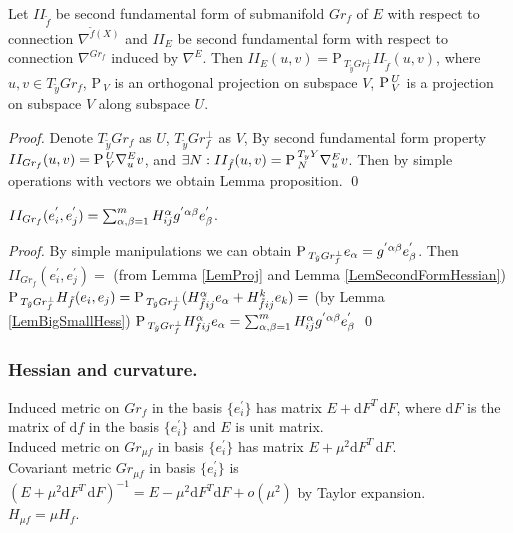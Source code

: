 \documentclass{llncs}
\newcommand{\Proj}{\mathrm{P}{\,}}
\newcommand{\ProjNonOrth}[2]{\tensor*{\Proj}{^{#1}_{#2}}}
\newcommand{\CovariantDiffManif}[1]{\nabla^{#1}}
\newcommand{\CovariantDerivManif}[2]{\tensor*{\nabla}{^{#1}_{#2}}}
\newcommand{\Diff}{\mathrm{d}}
\begin{document}
\begin{lemma} \label{LemProj}
Let $II_{\tilde{f}}$ be second fundamental form of submanifold $Gr_f$ of $E$ with respect to connection $\CovariantDiffManif{\tilde{f}(X)}$ and $II_E$ be second fundamental form with respect to connection $\CovariantDiffManif{Gr_f}$ induced by $\CovariantDiffManif{E}$. Then $II_E(u, v) = \Proj_{T_{\tilde{y}}Gr_f^{\bot}} II_{\tilde{f}}(u, v)$, where $u, v \in T_{\tilde{y}}Gr_f$, $\Proj_V$ is an orthogonal projection on subspace $V$, $\ProjNonOrth{U}{V}$ is a projection on subspace $V$ along subspace $U$.
\end{lemma}

\begin{proof}
Denote $T_{\tilde{y}}Gr_f$ as $U$, $T_{\tilde{y}}Gr_f^{\bot}$ as $V$, 
By second fundamental form property $II_{Gr_f}(u, v) = \ProjNonOrth{U}{V}\CovariantDerivManif{E}{u}v$, and $\exists N: 
II_{\tilde{f}}(u, v) = \ProjNonOrth{T_yY}{N}\CovariantDerivManif{E}{u}v$. Then by simple operations with vectors we obtain Lemma proposition.
\qed
\end{proof}

\begin{lemma} \label{LemSecondHessianFormula}
$II_{Gr_f}(e_i^{'}, e_j^{'})=\sum_{\alpha, \beta=1}^{m} \tensor*{H}{^{\alpha}_i_j} \tensor*{g}{^{'}^{\alpha}^{\beta}} e_{\beta}^{'}$.
\end{lemma}

\begin{proof}
By simple manipulations we can obtain $\Proj_{T_{\tilde{y}}Gr_f^{\bot}}e_{\alpha} = \tensor*{g}{^{'}^{\alpha}^{\beta}} e_{\beta}^{'}$. 
Then $II_{Gr_f}(e_i^{'}, e_j^{'}) =$ (from Lemma \ref{LemProj} and Lemma \ref{LemSecondFormHessian}) 
$\Proj_{T_{\tilde{y}}Gr_f^{\bot}} H_{\tilde{f}}(e_i, e_j) = 
\Proj_{T_{\tilde{y}}Gr_f^{\bot}} (\tensor*{H}{_{\tilde{f}}^{\alpha}_i_j} e_{\alpha} + \tensor*{H}{^{k}_{\tilde{f}}_i_j} e_{k}) 
=$ (by Lemma \ref{LemBigSmallHess}) $\Proj_{T_{\tilde{y}}Gr_f^{\bot}} \tensor*{H}{^{\alpha}_f_i_j}e_{\alpha} 
= \sum_{\alpha, \beta=1}^{m} \tensor*{H}{^{\alpha}_i_j} \tensor*{g}{^{'}^{\alpha}^{\beta}} e_{\beta}^{'}$
\qed
\end{proof}

\subsubsection{Hessian and curvature.}

\begin{proposition} \label{PropScaled}
Induced metric on $Gr_f$ in the basis $\{ e_i^{'} \}$ has matrix $E + \Diff F^{T} \, \Diff F$, 
where $\Diff F$ is the matrix of $\Diff f$ in the basis $\{ e_i^{'} \}$ and $E$ is unit matrix.
\\
Induced metric on $Gr_{\mu f}$ in basis $\{ e_i^{'} \}$ has matrix $E + \mu^{2} \Diff F^{T} \, \Diff F$.
\\
Covariant metric $Gr_{\mu f}$ in basis $\{ e_i^{'} \}$ is $(E + \mu^{2} \Diff F^{T} \, \Diff F)^{-1}
 = E - \mu^{2} \Diff F^{T} \Diff F + o(\mu ^ {2})$ by Taylor expansion.
\\
$H_{\mu f} = \mu H_f$.
\end{proposition}
\end{document}
